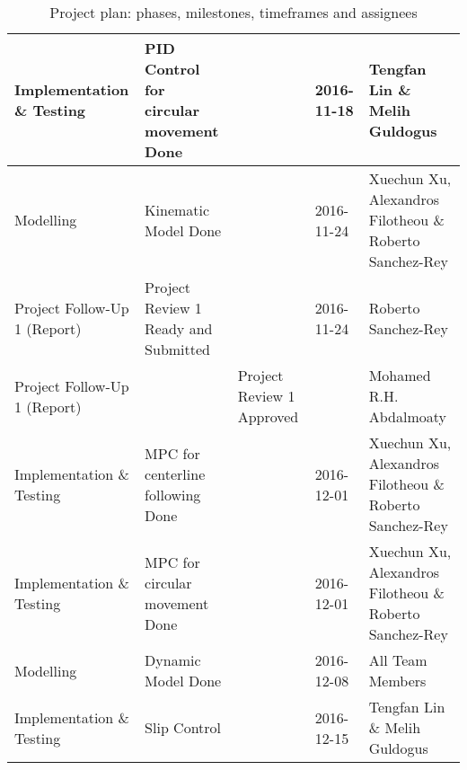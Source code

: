 \begin{landscape}
\begin{table}
\begin{tabularx}{\linewidth}{l|X|XXX}
    Implementation \& Testing       & PID Control for circular movement Done              & ~                                             & 2016-11-18 & Tengfan Lin \& Melih Guldogus                            \\ \hline
    Modelling                       & Kinematic Model Done                                & ~                                             & 2016-11-24 & Xuechun Xu, Alexandros Filotheou \& Roberto Sanchez-Rey  \\ \hline
    Project Follow-Up 1 (Report)    & Project Review 1 Ready and Submitted                & ~                                             & 2016-11-24 & Roberto Sanchez-Rey                                      \\
    Project Follow-Up 1 (Report)    & ~                                                   & Project Review 1 Approved                     & ~          & Mohamed R.H. Abdalmoaty                                  \\ \hline
    Implementation \& Testing       & MPC for centerline following Done                   & ~                                             & 2016-12-01 & Xuechun Xu, Alexandros Filotheou \& Roberto Sanchez-Rey  \\
    Implementation \& Testing       & MPC for circular movement Done                      & ~                                             & 2016-12-01 & Xuechun Xu, Alexandros Filotheou \& Roberto Sanchez-Rey  \\ \hline
    Modelling                       & Dynamic Model Done                                  & ~                                             & 2016-12-08 & All Team Members                                         \\ \hline
    Implementation \& Testing       & Slip Control                                        & ~                                             & 2016-12-15 & Tengfan Lin \& Melih Guldogus                            \\ \hline
\end{tabularx}
\caption{Project plan: phases, milestones, timeframes and assignees}
\label{tbl:project_plan_1}
\end{table}
\end{landscape}

